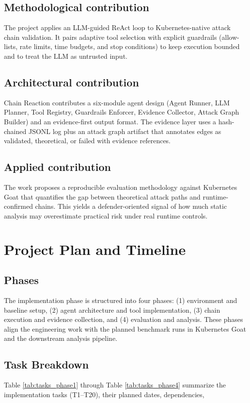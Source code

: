 \documentclass[conference]{IEEEtran}
\begin{document}
\subsection{Methodological contribution}
The project applies an LLM-guided ReAct loop to Kubernetes-native attack chain validation. It pairs adaptive tool selection with explicit guardrails (allow-lists, rate limits, time budgets, and stop conditions) to keep execution bounded and to treat the LLM as untrusted input.

\subsection{Architectural contribution}
Chain Reaction contributes a six-module agent design (Agent Runner, LLM Planner, Tool Registry, Guardrails Enforcer, Evidence Collector, Attack Graph Builder) and an evidence-first output format. The evidence layer uses a hash-chained JSONL log plus an attack graph artifact that annotates edges as validated, theoretical, or failed with evidence references.

\subsection{Applied contribution}
The work proposes a reproducible evaluation methodology against Kubernetes Goat that quantifies the gap between theoretical attack paths and runtime-confirmed chains. This yields a defender-oriented signal of how much static analysis may overestimate practical risk under real runtime controls.

\section{Project Plan and Timeline}

\subsection{Phases}
The implementation phase is structured into four phases: (1) environment and baseline setup, (2) agent architecture and tool implementation, (3) chain execution and evidence collection, and (4) evaluation and analysis. These phases align the engineering work with the planned benchmark runs in Kubernetes Goat and the downstream analysis pipeline.

\subsection{Task Breakdown}
Table \ref{tab:tasks_phase1} through Table \ref{tab:tasks_phase4} summarize the implementation tasks (T1--T20), their planned dates, dependencies, 
\end{document}
